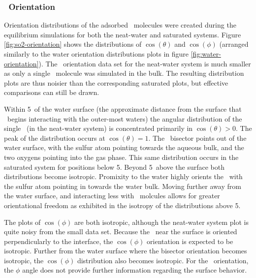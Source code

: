 \subsubsection{\suldiox~Orientation}

Orientation distributions of the adsorbed \suldiox~molecules were created during the equilibrium simulations for both the neat-water and saturated systems. Figure \ref{fig:so2-orientation} shows the distributions of $\cos(\theta)$ and $\cos(\phi)$ (arranged similarly to the water orientation distributions plots in figure \ref{fig:water-orientation}). The \suldiox~orientation data set for the neat-water system is much smaller as only a single \suldiox~molecule was simulated in the bulk. The resulting distribution plots are thus noisier than the corresponding saturated plots, but effective comparisons can still be drawn.

Within 5\angs~of the water surface (the approximate distance from the surface that \suldiox~begins interacting with the outer-most waters) the angular distribution of the single \suldiox~(in the neat-water system) is concentrated primarily in $\cos(\theta)>0$. The peak of the distribution occurs at $\cos(\theta)=1$. The \suldiox~bisector points out of the water surface, with the sulfur atom pointing towards the aqueous bulk, and the two oxygens pointing into the gas phase. This same distribution occurs in the saturated system for positions below 5\angs. Beyond 5\angs~above the surface both distributions become isotropic. Promixity to the water highly orients the \suldiox~with the sulfur atom pointing in towards the water bulk. Moving further away from the water surface, and interacting less with \wat~molcules allows for greater orientational freedom as exhibited in the isotropy of the distributions above 5\angs. %

The plots of $\cos(\phi)$ are both isotropic, although the neat-water system plot is quite noisy from the small data set. Because the \suldiox~near the surface is oriented perpendicularly to the interface, the $\cos(\phi)$ orientation is expected to be isotropic. Further from the water surface where the bisector orientation becomes isotropic, the $\cos(\phi)$ distribution also becomes isotropic. For the \suldiox~orientation, the $\phi$ angle does not provide further information regarding the surface behavior.


